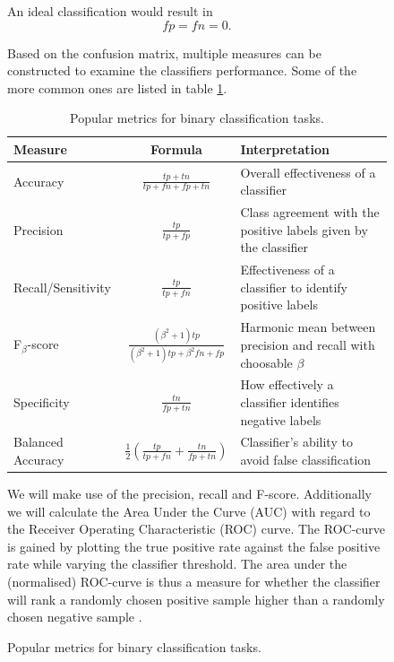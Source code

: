 \begin{figure}
An ideal classification would result in
\begin{equation*}
  fp = fn = 0.
\end{equation*}

Based on the confusion matrix, multiple measures
can be constructed to examine the classifiers performance.
Some of the more common ones are listed in table \ref{tab:class_metrics}.

\begin{table}
    \caption{Popular metrics for binary classification tasks.}
    \begin{center}
        \begin{tabularx}{\textwidth}{l c X}
            Measure & Formula & Interpretation \\
            \hline
            Accuracy & $\frac{tp+tn}{tp+fn+fp+tn}$ & Overall effectiveness of a classifier \\
            Precision & $\frac{tp}{tp+fp}$ & Class agreement with the positive labels given by the classifier \\
            Recall/Sensitivity & $\frac{tp}{tp+fn}$ & Effectiveness of a classifier to identify positive labels \\
            F$_{\beta}$-score & $\frac{(\beta^2+1)tp}{(\beta^2+1)tp+\beta^2fn+fp}$ & Harmonic mean between precision and recall with choosable $\beta$ \\
            Specificity & $\frac{tn}{fp+tn}$ & How effectively a classifier identifies negative labels \\
            Balanced Accuracy & $\frac{1}{2}(\frac{tp}{tp+fn}+\frac{tn}{fp+tn})$ & Classifier’s ability to avoid false classification \\
        \end{tabularx}
    \end{center}
    \label{tab:class_metrics}
\end{table}

We will make use of the precision, recall and F-score.
Additionally we will calculate the Area Under the Curve (AUC) with regard to the Receiver Operating Characteristic (ROC) curve.
The ROC-curve is gained by plotting the true positive rate against the false positive rate while varying the classifier threshold.
The area under the (normalised) ROC-curve is thus a measure for whether the classifier will
rank a randomly chosen positive sample higher than a randomly chosen negative sample \cite{FAWCETT2006861}.


\end{figure}
